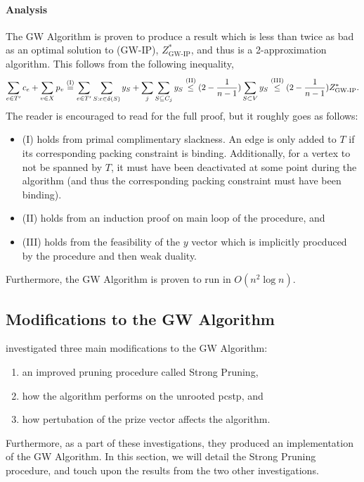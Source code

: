  \paragraph{Analysis}
 The GW Algorithm is proven to produce a result which is less than twice as bad as an optimal solution to (GW-IP), $Z^*_{\text{GW-IP}}$, and thus
 is a 2-approximation algorithm. This follows from the following inequality,
 $$\sum_{e \in T'}c_e + \sum_{v \in X} p_v \overset{\text{(I)}}{=}   \sum_{e \in T'} \sum_{S: e \in \delta(S)} y_S  + \sum_{j} \sum_{S \subseteq C_j} y_S
 \overset{\text{(II)}}{\leq} (2 - \frac{1}{n-1}) \sum_{S \subset V} y_S \overset{\text{(III)}}{\leq} (2 - \frac{1}{n-1}) Z^*_{\text{GW-IP}}\mathnormal{.}$$
 The reader is encouraged to read \citet{goemans1997primal} for the full proof, but it roughly goes as follows:
 \begin{itemize}
 \item (I) holds from primal complimentary slackness. An edge is only added to $T$ if its corresponding packing constraint is binding.
   Additionally, for a vertex to not be spanned by $T$, it must have been deactivated at some point during the
    algorithm (and thus the corresponding packing constraint must have
    been binding).
  \item (II) holds from an induction proof on main loop of the procedure, and
  \item (III) holds from the feasibility of the $y$ vector which is implicitly procduced by the procedure and then weak duality.
 \end{itemize}
 Furthermore, the GW Algorithm is proven to run in $O(n^2 \log n)$.
 \subsection{Modifications to the GW Algorithm}\label{sec:approx:strongpruning}
 \citet{Johnson:2000:PCS:338219.338637} investigated three main modifications to the GW Algorithm:
 \begin{enumerate}
 \item an improved pruning procedure called Strong Pruning,
 \item how the algorithm performs on the unrooted \gls{pcstp}, and
 \item how pertubation of the prize vector affects the algorithm.
 \end{enumerate}
 Furthermore, as a part of these investigations, they produced an implementation of the GW Algorithm.
 In this section, we will detail the Strong Pruning procedure, and touch upon the results from the two other
  investigations.
